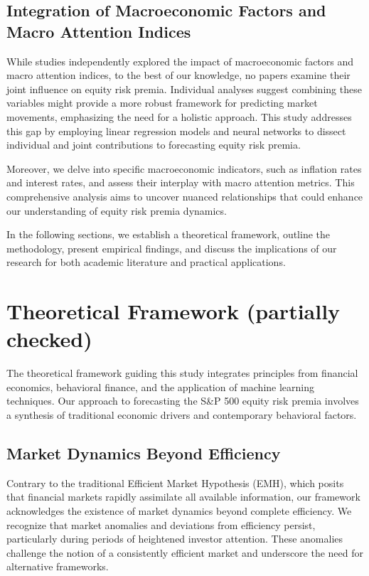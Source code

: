 \documentclass{article}
\begin{document}
\subsection{Integration of Macroeconomic Factors and Macro Attention Indices}

While studies independently explored the impact of macroeconomic factors and macro attention indices, to the best of our knowledge, no papers examine their joint influence on equity risk premia. Individual analyses suggest combining these variables might provide a more robust framework for predicting market movements, emphasizing the need for a holistic approach. This study addresses this gap by employing linear regression models and neural networks to dissect individual and joint contributions to forecasting equity risk premia.

Moreover, we delve into specific macroeconomic indicators, such as inflation rates and interest rates, and assess their interplay with macro attention metrics. This comprehensive analysis aims to uncover nuanced relationships that could enhance our understanding of equity risk premia dynamics.

In the following sections, we establish a theoretical framework, outline the methodology, present empirical findings, and discuss the implications of our research for both academic literature and practical applications.


\newpage

\section{Theoretical Framework (partially checked)}

The theoretical framework guiding this study integrates principles from financial economics, behavioral finance, and the application of machine learning techniques. Our approach to forecasting the S\&P 500 equity risk premia involves a synthesis of traditional economic drivers and contemporary behavioral factors.

\subsection{Market Dynamics Beyond Efficiency}

Contrary to the traditional Efficient Market Hypothesis (EMH), which posits that financial markets rapidly assimilate all available information, our framework acknowledges the existence of market dynamics beyond complete efficiency. We recognize that market anomalies and deviations from efficiency persist, particularly during periods of heightened investor attention. These anomalies challenge the notion of a consistently efficient market and underscore the need for alternative frameworks.
\end{document}
